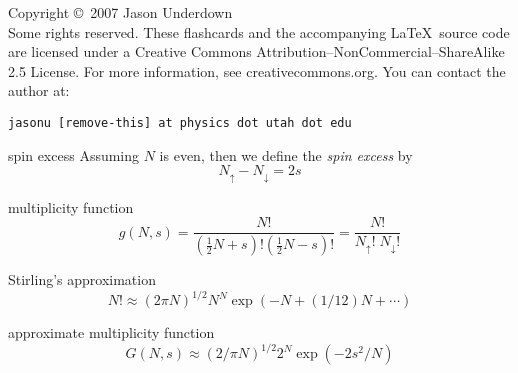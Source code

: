 \documentclass[avery5371,grid]{flashcards}
\begin{document}
\begin{flashcard}{Copyright \copyright \, 2007 Jason Underdown \\
Some rights reserved.}
These flashcards and the accompanying \LaTeX \, source code are licensed
under a Creative Commons Attribution--NonCommercial--ShareAlike 2.5 License.  
For more information, see creativecommons.org.  You can contact the author at:
\begin{center}
\begin{small}\tt jasonu [remove-this] at physics dot utah dot edu\end{small}
\end{center}
\end{flashcard}

\begin{flashcard}[Definition]{spin excess}
Assuming $N$ is even, then we define the \textit{spin excess} by
\begin{equation*}
N_{\uparrow} - N_{\downarrow} = 2s
\end{equation*}
\end{flashcard}

\begin{flashcard}[Formula]{multiplicity function}
\begin{equation*}
g(N,s) = 
\frac{N!}{\left(\frac{1}{2}N+s \right)! \left(\frac{1}{2}N-s \right)!} =
\frac{N!}{N_{\uparrow}! \; N_{\downarrow}!}
\end{equation*}
\end{flashcard}

\begin{flashcard}[Formula]{Stirling's approximation}
\begin{equation*}
N! \approx (2\pi N)^{1/2} N^{N} \exp(-N +(1/12)N + \cdots)
\end{equation*}
\end{flashcard}

\begin{flashcard}[Formula]{approximate multiplicity function}
\begin{equation*}
G(N,s) \approx (2 / \pi N)^{1/2} 2^{N} \exp(-2s^2/N)
\end{equation*}
\end{flashcard}
\end{document}
